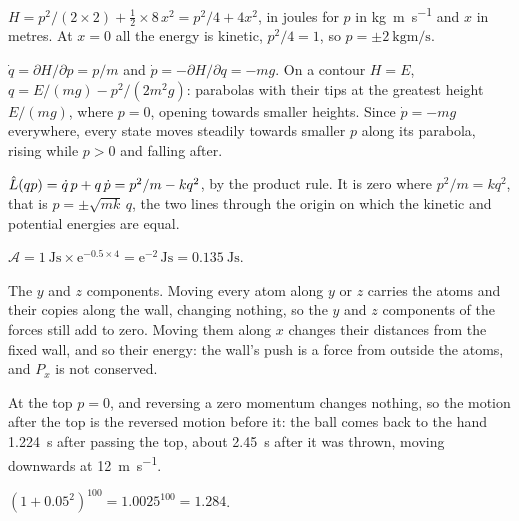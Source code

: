 \label{sec:ha-answers}

$H = p^2/(2\times2) + \frac12\times8\,x^2 =
p^2/4 + 4x^2$, in joules for $p$ in \si{\kilogram\metre\per\second} and $x$
in metres. At $x = 0$ all the energy is kinetic, $p^2/4 = 1$, so $p =
\pm\SI{2}{\kilogram\metre\per\second}$.

$\dot{q} = \partial H/\partial p = p/m$ and
$\dot{p} = -\partial H/\partial q = -mg$. On a contour $H = E$, $q =
E/(mg) - p^2/(2m^2g)$: parabolas with their tips at the greatest height
$E/(mg)$, where $p = 0$, opening towards smaller heights. Since $\dot{p} =
-mg$ everywhere, every state moves steadily towards smaller $p$ along its
parabola, rising while $p > 0$ and falling after.

$\hat{L}(qp) = \dot{q}\,p + q\,\dot{p} = p^2/m -
kq^2$, by the product rule. It is zero where $p^2/m = kq^2$, that is $p =
\pm\sqrt{mk}\,q$, the two lines through the origin on which the kinetic
and potential energies are equal.

$\mathcal{A} = \SI{1}{\joule\second}\times
\mathrm{e}^{-0.5\times4} = \mathrm{e}^{-2}\,\si{\joule\second} =
\SI{0.135}{\joule\second}$.

The $y$ and $z$ components. Moving every atom
along $y$ or $z$ carries the atoms and their copies along the wall,
changing nothing, so the $y$ and $z$ components of the forces still add to zero. Moving them along $x$
changes their distances from the fixed wall, and so their energy: the
wall's push is a force from outside the atoms, and $P_x$ is not
conserved.

At the top $p = 0$, and reversing a zero momentum
changes nothing, so the motion after the top is the reversed motion before
it: the ball comes back to the hand \SI{1.224}{\second} after passing the
top, about \SI{2.45}{\second} after it was thrown, moving downwards at
\SI{12}{\metre\per\second}.

$(1 + 0.05^2)^{100} = 1.0025^{100} = 1.284$.
